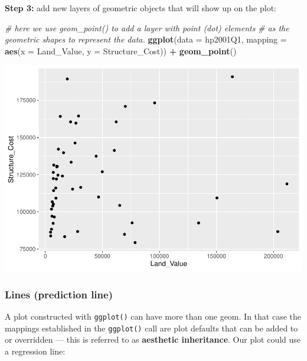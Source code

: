 \documentclass[
]{book}
\newenvironment{Shaded}{\begin{snugshade}}{\end{snugshade}}
\newcommand{\CommentTok}[1]{\textcolor[rgb]{0.56,0.35,0.01}{\textit{#1}}}
\newcommand{\DataTypeTok}[1]{\textcolor[rgb]{0.13,0.29,0.53}{#1}}
\newcommand{\KeywordTok}[1]{\textcolor[rgb]{0.13,0.29,0.53}{\textbf{#1}}}
\newcommand{\NormalTok}[1]{#1}
\newcommand{\OperatorTok}[1]{\textcolor[rgb]{0.81,0.36,0.00}{\textbf{#1}}}
\newcommand{\StringTok}[1]{\textcolor[rgb]{0.31,0.60,0.02}{#1}}
\begin{document}
\textbf{Step 3:} add new layers of geometric objects that will show up on the plot:

\begin{Shaded}
\begin{Highlighting}[]
\CommentTok{\# here we use geom\_point() to add a layer with point (dot) elements }
\CommentTok{\# as the geometric shapes to represent the data.}
\KeywordTok{ggplot}\NormalTok{(}\DataTypeTok{data =}\NormalTok{ hp2001Q1, }\DataTypeTok{mapping =} \KeywordTok{aes}\NormalTok{(}\DataTypeTok{x =}\NormalTok{ Land\_Value, }\DataTypeTok{y =}\NormalTok{ Structure\_Cost)) }\OperatorTok{+}
\StringTok{  }\KeywordTok{geom\_point}\NormalTok{()}
\end{Highlighting}
\end{Shaded}

\includegraphics{R/Rgraphics/figures/unnamed-chunk-156-1.pdf}

\hypertarget{lines-prediction-line}{%
\subsubsection{Lines (prediction line)}\label{lines-prediction-line}}

A plot constructed with \texttt{ggplot()} can have more than one geom. In that case the mappings established in the \texttt{ggplot()} call are plot defaults that can be added to or overridden --- this is referred to as \textbf{aesthetic inheritance}. Our plot could use a regression line:
\end{document}
